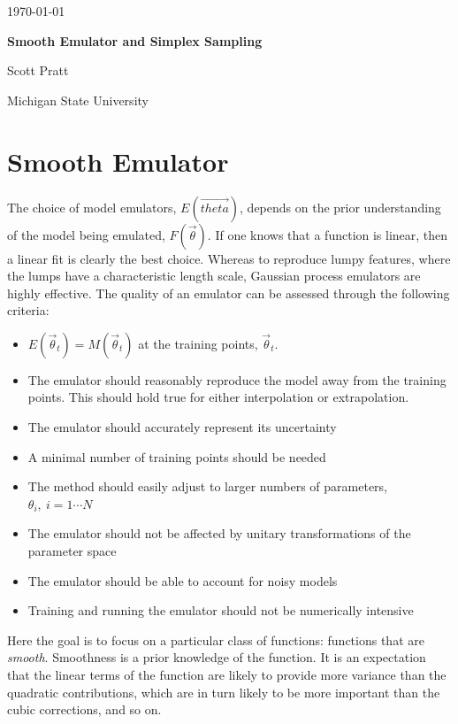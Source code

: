 \documentclass[12pt]{article}
\numberwithin{equation}{section}
\numberwithin{figure}{section}
\begin{document}
\today\\

\centerline{\bf\Large Smooth Emulator and Simplex Sampling}
\centerline{Scott Pratt}
\centerline{Michigan State University}

\section{Smooth Emulator}

The choice of model emulators, $E(\vec{theta})$, depends on the prior understanding of the model being emulated, $F(\vec{\theta})$. If one knows that  a function is linear, then a linear fit is clearly the best choice. Whereas to reproduce lumpy features, where the lumps have a characteristic length scale, Gaussian process emulators are highly effective. The quality of an emulator can be assessed through the following criteria:
\begin{itemize}
  \item $E(\vec{\theta}_t)=M(\vec{\theta}_t)$ at the training points, $\vec{\theta}_t$. 
  \item The emulator should reasonably reproduce the model away from the training points. This should hold true for either interpolation or extrapolation.
  \item The emulator should accurately represent its uncertainty
  \item A minimal number of training points should be needed
  \item The method should easily adjust to larger numbers of parameters, $\theta_i,~i=1\cdots N$
  \item The emulator should not be affected by unitary transformations of the parameter space
  \item The emulator should be able to account for noisy models
  \item Training and running the emulator should not be numerically intensive
\end{itemize}

Here the goal is to focus on a particular class of functions: functions that are {\it smooth}. Smoothness is a prior knowledge of the function. It is an expectation that the linear terms of the function are likely to provide more variance than the quadratic contributions, which are in turn likely to be more important than the cubic corrections, and so on. 
\end{document}
